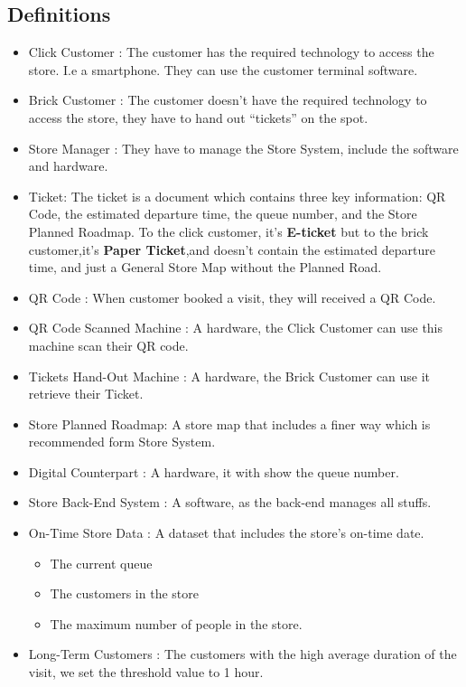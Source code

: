 \documentclass[a4paper,12pt]{report}
\begin{document}
\subsection{Definitions}\label{Definitions}
\begin{itemize}
	\item Click Customer : The customer has the required technology to access the store. I.e a smartphone. They can use the customer terminal software.
	\item Brick Customer : The customer doesn't have the required technology to access the store, they have to hand out “tickets” on the spot.
	\item Store Manager : They have to manage the Store System, include the software and hardware.
	\item Ticket: The ticket is a document which contains three key information: QR Code, the estimated departure time, the queue number, and the Store Planned Roadmap. To the click customer, it's \textbf{E-ticket} but to the brick customer,it's \textbf{Paper Ticket},and doesn't contain the estimated departure time, and just a General Store Map without the Planned Road.
	\item QR Code : When customer booked a visit, they will received a QR Code.
	\item QR Code Scanned Machine : A hardware, the Click Customer can use this machine scan their QR code.
	\item Tickets Hand-Out Machine : A hardware, the Brick Customer can use it retrieve their Ticket.
	\item Store Planned Roadmap: A store map that includes a finer way which is recommended form Store System.
	\item Digital Counterpart : A hardware, it with show the queue number.
	\item Store Back-End System : A software, as the back-end manages all stuffs.
	\item On-Time Store Data : A dataset that includes the store's on-time date.
	\begin{itemize}
	\item The current queue 
	\item The customers in the store
	\item The maximum number of people in the store.
	\end{itemize}
	\item Long-Term Customers : The customers with the high average duration of the visit, we set the threshold value to 1 hour.
\end{itemize}
\end{document}

